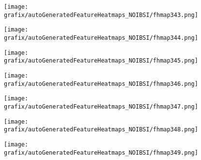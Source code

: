 \begin{subfigure}{\wid\textwidth} 
    \centering 
    \caption{\tiny \sffamily {}} 
    \vspace{\vsp} 
    \texttt{[image: grafix/autoGeneratedFeatureHeatmaps\_NOIBSI/fhmap343.png]} 
\end{subfigure} 
\hspace{\hsp} 
\begin{subfigure}{\wid\textwidth} 
    \centering 
    \caption{\tiny \sffamily {}} 
    \vspace{\vsp} 
    \texttt{[image: grafix/autoGeneratedFeatureHeatmaps\_NOIBSI/fhmap344.png]} 
\end{subfigure} 
\hspace{\hsp} 
\begin{subfigure}{\wid\textwidth} 
    \centering 
    \caption{\tiny \sffamily {}} 
    \vspace{\vsp} 
    \texttt{[image: grafix/autoGeneratedFeatureHeatmaps\_NOIBSI/fhmap345.png]} 
\end{subfigure} 
\hspace{\hsp} 
\begin{subfigure}{\wid\textwidth} 
    \centering 
    \caption{\tiny \sffamily {}} 
    \vspace{\vsp} 
    \texttt{[image: grafix/autoGeneratedFeatureHeatmaps\_NOIBSI/fhmap346.png]} 
\end{subfigure} 
\hspace{\hsp} 
\begin{subfigure}{\wid\textwidth} 
    \centering 
    \caption{\tiny \sffamily {}} 
    \vspace{\vsp} 
    \texttt{[image: grafix/autoGeneratedFeatureHeatmaps\_NOIBSI/fhmap347.png]} 
\end{subfigure} 
\hspace{\hsp} 
\begin{subfigure}{\wid\textwidth} 
    \centering 
    \caption{\tiny \sffamily {}} 
    \vspace{\vsp} 
    \texttt{[image: grafix/autoGeneratedFeatureHeatmaps\_NOIBSI/fhmap348.png]} 
\end{subfigure} 
\hspace{\hsp} 
\begin{subfigure}{\wid\textwidth} 
    \centering 
    \caption{\tiny \sffamily {}} 
    \vspace{\vsp} 
    \texttt{[image: grafix/autoGeneratedFeatureHeatmaps\_NOIBSI/fhmap349.png]} 
\end{subfigure} 
